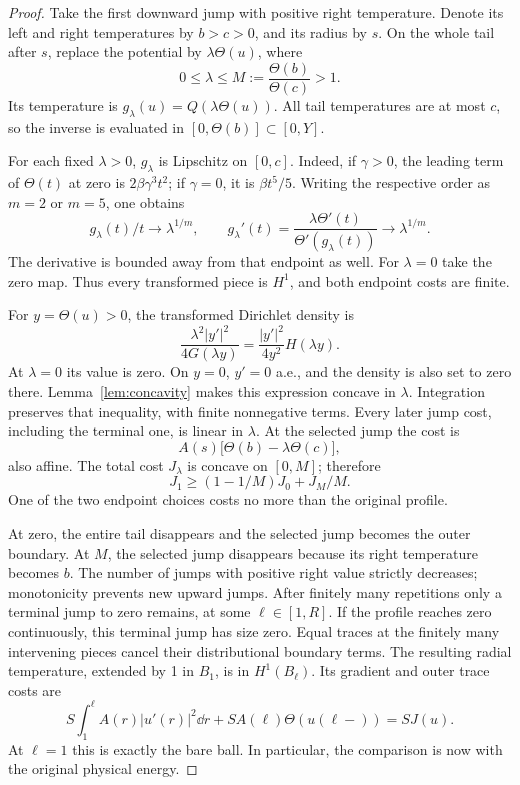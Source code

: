 \begin{proof}
Take the first downward jump with positive right temperature. Denote
its left and right temperatures by \(b>c>0\), and its radius by \(s\).
On the whole tail after \(s\), replace the potential by
\(\lambda\Theta(u)\), where
\[
 0\le\lambda\le M:=\frac{\Theta(b)}{\Theta(c)}>1.
\]
Its temperature is \(g_\lambda(u)=Q(\lambda\Theta(u))\).
All tail temperatures are at most \(c\), so the inverse is evaluated
in \([0,\Theta(b)]\subset[0,Y]\).

For each fixed \(\lambda>0\), \(g_\lambda\) is Lipschitz on \([0,c]\).
Indeed, if \(\gamma>0\), the leading term of \(\Theta(t)\) at zero
is \(2\beta\gamma^3t^2\); if \(\gamma=0\), it is \(\beta t^5/5\).
Writing the respective order as \(m=2\) or \(m=5\), one obtains
\[
 g_\lambda(t)/t\longrightarrow\lambda^{1/m},\qquad
 g_\lambda'(t)=\frac{\lambda\Theta'(t)}
                         {\Theta'(g_\lambda(t))}
                         \longrightarrow\lambda^{1/m}.
\]
The derivative is bounded away from that endpoint as well.
For \(\lambda=0\) take the zero map. Thus every transformed piece
is \(H^1\), and both endpoint costs are finite.

For \(y=\Theta(u)>0\), the transformed Dirichlet density is
\[
 \frac{\lambda^2|y'|^2}{4G(\lambda y)}
                   =\frac{|y'|^2}{4y^2}H(\lambda y).
\]
At \(\lambda=0\) its value is zero. On \(y=0\), \(y'=0\) a.e.,
and the density is also set to zero there.
Lemma~\ref{lem:concavity} makes this expression concave in \(\lambda\).
Integration preserves that inequality, with finite nonnegative
terms. Every later jump cost, including the terminal one, is linear
in \(\lambda\). At the selected jump the cost is
\[
 A(s)\bigl[\Theta(b)-\lambda\Theta(c)\bigr],
\]
also affine. The total cost \(J_\lambda\) is concave on \([0,M]\);
therefore
\[
 J_1\ge(1-1/M)J_0+J_M/M.
\]
One of the two endpoint choices costs no more than the original profile.

At zero, the entire tail disappears and the selected jump becomes
the outer boundary. At \(M\), the selected jump disappears because
its right temperature becomes \(b\). The number of jumps with
positive right value strictly decreases; monotonicity prevents
new upward jumps. After finitely many repetitions only a terminal
jump to zero remains, at some \(\ell\in[1,R]\).
If the profile reaches zero continuously, this terminal jump has
size zero. Equal traces at the finitely many intervening pieces
cancel their distributional boundary terms. The resulting radial
temperature, extended by 1 in \(B_1\), is in \(H^1(B_\ell)\).
Its gradient and outer trace costs are
\[
 S\int_1^\ell A(r)|u'(r)|^2\dd r
              +S A(\ell)\Theta(u(\ell-))=S J(u).
\]
At \(\ell=1\) this is exactly the bare ball. In particular, the
comparison is now with the original physical energy.
\end{proof}

